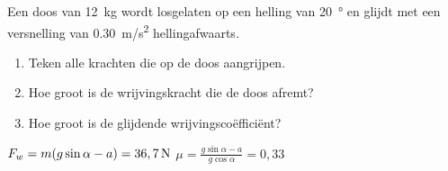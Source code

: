 


\item Een doos van \SI{12}{kg} wordt losgelaten op een helling van \SI{20}{\degree} en glijdt met een versnelling van \SI{0,30}{m/s^2} hellingafwaarts. 
\begin{enumerate}
	\item{}Teken alle krachten die op de doos aangrijpen.
	\item{}Hoe groot is de wrijvingskracht die de doos afremt?
  	\item{}Hoe groot is de glijdende wrijvingsco\"effici\"ent?
\end{enumerate}
\begin{oplossing}
$F_w=m(g\sin{\alpha}-a)=36,7\rm\,N$ 
\newline
$\mu=\frac{g\sin{\alpha}-a}{g\cos{\alpha}}=0,33$
\end{oplossing}